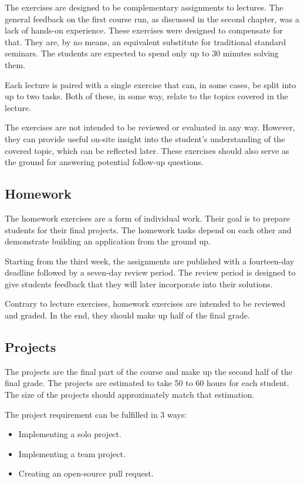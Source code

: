 \documentclass[
  digital,
  color,
  oneside,
  nosansbold,
  nocolorbold,
  lof,
  lot,
]{fithesis4}
\begin{document}
The exercises are designed to be complementary assignments to lectures. The general feedback on the first course run, as discussed in the second chapter, was a lack of hands-on experience. These exercises were designed to compensate for that. They are, by no means, an equivalent substitute for traditional standard seminars. The students are expected to spend only up to 30 minutes solving them.

Each lecture is paired with a single exercise that can, in some cases, be split into up to two tasks. Both of these, in some way, relate to the topics covered in the lecture.

The exercises are not intended to be reviewed or evaluated in any way. However, they can provide useful on-site insight into the student's understanding of the covered topic, which can be reflected later. These exercises should also serve as the ground for answering potential follow-up questions.

\subsection{Homework}

The homework exercises are a form of individual work. Their goal is to prepare students for their final projects. The homework tasks depend on each other and demonstrate building an application from the ground up.

Starting from the third week, the assignments are published with a fourteen-day deadline followed by a seven-day review period. The review period is designed to give students feedback that they will later incorporate into their solutions.

Contrary to lecture exercises, homework exercises are intended to be reviewed and graded. In the end, they should make up half of the final grade.

\subsection{Projects}

The projects are the final part of the course and make up the second half of the final grade. The projects are estimated to take 50 to 60 hours for each student. The size of the projects should approximately match that estimation.

The project requirement can be fulfilled in 3 ways:
\begin{itemize}
 \item Implementing a solo project.
 \item Implementing a team project.
 \item Creating an open-source pull request.
\end{itemize}
\end{document}
